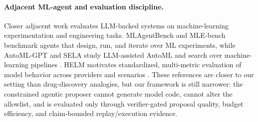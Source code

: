 \paragraph{Adjacent ML-agent and evaluation discipline.}
Closer adjacent work evaluates LLM-backed systems on machine-learning
experimentation and engineering tasks. MLAgentBench and MLE-bench benchmark
agents that design, run, and iterate over ML experiments, while AutoML-GPT and
SELA study LLM-assisted AutoML and search over machine-learning pipelines
\cite{huang2024mlagentbench,chan2025mlebench,zhang2023automlgpt,chi2024sela}.
HELM motivates standardized, multi-metric evaluation of model behavior across
providers and scenarios \cite{liang2023helm}. These references are closer to
our setting than drug-discovery analogies, but our framework is still narrower:
the constrained agentic proposer cannot generate model code, cannot alter the
allowlist, and is evaluated only through verifier-gated proposal quality,
budget efficiency, and claim-bounded replay/execution evidence.
